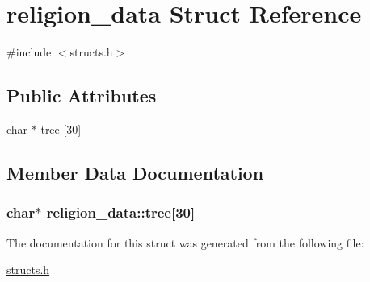 \hypertarget{structreligion__data}{\section{religion\-\_\-data Struct Reference}
\label{structreligion__data}
}


{\ttfamily \#include $<$structs.\-h$>$}

\subsection*{Public Attributes}
\begin{DoxyCompactItemize}
\item 
char $\ast$ \hyperlink{structreligion__data_af20c3418eafaf370977184fa21c8fd4f}{tree} \mbox{[}30\mbox{]}
\end{DoxyCompactItemize}


\subsection{Member Data Documentation}
\hypertarget{structreligion__data_af20c3418eafaf370977184fa21c8fd4f}{
\subsubsection[{tree}]{\setlength{\rightskip}{0pt plus 5cm}char$\ast$ religion\-\_\-data\-::tree\mbox{[}30\mbox{]}}}\label{structreligion__data_af20c3418eafaf370977184fa21c8fd4f}


The documentation for this struct was generated from the following file\-:\begin{DoxyCompactItemize}
\item 
\hyperlink{structs_8h}{structs.\-h}\end{DoxyCompactItemize}
